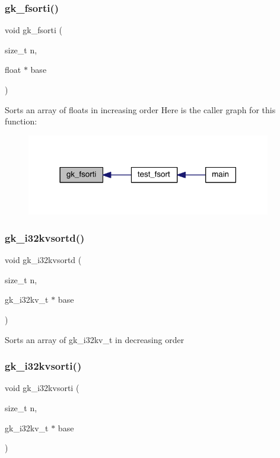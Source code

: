 \subsubsection{\texorpdfstring{gk\+\_\+fsorti()}{gk\_fsorti()}}
{\footnotesize\ttfamily void gk\+\_\+fsorti (\begin{DoxyParamCaption}\item[{size\+\_\+t}]{n,  }\item[{float $\ast$}]{base }\end{DoxyParamCaption})}

Sorts an array of floats in increasing order Here is the caller graph for this function\+:\nopagebreak
\begin{figure}[H]
\begin{center}
\leavevmode
\includegraphics[width=302pt]{a00140_ab149dbe80d68dde0fd497f852233b3d8_icgraph}
\end{center}
\end{figure}
\mbox{\label{a00140_a0e979cb0725e053df4397f40d02ce23f}} 
\subsubsection{\texorpdfstring{gk\+\_\+i32kvsortd()}{gk\_i32kvsortd()}}
{\footnotesize\ttfamily void gk\+\_\+i32kvsortd (\begin{DoxyParamCaption}\item[{size\+\_\+t}]{n,  }\item[{gk\+\_\+i32kv\+\_\+t $\ast$}]{base }\end{DoxyParamCaption})}

Sorts an array of gk\+\_\+i32kv\+\_\+t in decreasing order \mbox{\label{a00140_a9a939089a3ab9d7ec9fb5e785543f45d}} 
\subsubsection{\texorpdfstring{gk\+\_\+i32kvsorti()}{gk\_i32kvsorti()}}
{\footnotesize\ttfamily void gk\+\_\+i32kvsorti (\begin{DoxyParamCaption}\item[{size\+\_\+t}]{n,  }\item[{gk\+\_\+i32kv\+\_\+t $\ast$}]{base }\end{DoxyParamCaption})}

